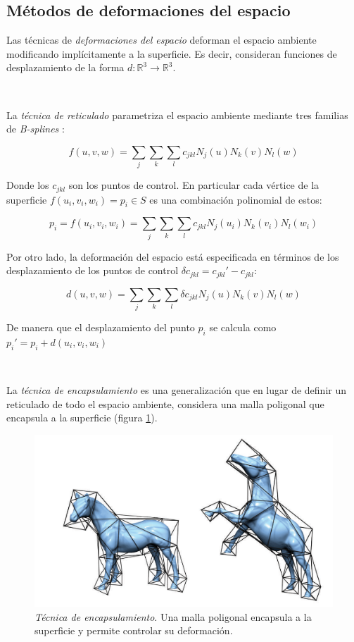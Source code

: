 \documentclass{article}
\begin{document}
\subsection{Métodos de deformaciones del espacio}
Las técnicas de \emph{deformaciones del espacio} deforman el espacio ambiente 
modificando implícitamente a la superficie. Es decir, consideran funciones 
de desplazamiento de la forma $d: \mathbb{R}^3 \rightarrow \mathbb{R}^3$.

\

La \emph{técnica de reticulado} parametriza el espacio ambiente 
mediante tres familias de \emph{B-splines} \cite{G:2015}:

$$f(u,v,w) = \sum_j \sum_k \sum_l c_{jkl} N_j(u) N_k(v) N_l(w)$$

Donde los $c_{jkl}$ son los puntos de control. En particular cada vértice de 
la superficie $f(u_i, v_i, w_i) = p_i \in S$ es una combinación polinomial 
de estos:

$$p_i = f(u_i, v_i, w_i) = \sum_j \sum_k \sum_l c_{jkl} N_j(u_i) N_k(v_i) N_l(w_i)$$

Por otro lado, la deformación del espacio está especificada en términos 
de los desplazamiento de los puntos de control $\delta c_{jkl} = c_{jkl}' - c_{jkl}$:

$$d(u,v,w) = \sum_j \sum_k \sum_l \delta c_{jkl} N_j(u) N_k(v) N_l(w)$$

De manera que el desplazamiento del punto $p_i$ se calcula como $p_i' = 
p_i + d(u_i,v_i,w_i)$

\

La \emph{técnica de encapsulamiento} es una generalización que en lugar 
de definir un reticulado de todo el espacio ambiente, considera una malla 
poligonal que encapsula a la superficie (figura \ref{fig:caballo}).

\begin{figure}
	\includegraphics[scale=.5]{caballo.png} %
	\caption{\emph{Técnica de encapsulamiento}. Una malla poligonal 
	encapsula a la superficie y permite controlar su deformación.}%
	\label{fig:caballo} %
\end{figure}
\end{document}
